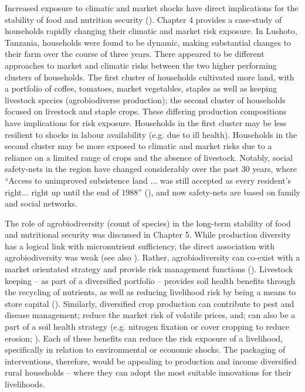 Increased exposure to climatic and market shocks have direct implications for the stability of food and nutrition security (\citealp{Ruel2018, Tomich2018, Jaenicke2013, Hussein1998}). Chapter 4 provides a case-study of households rapidly changing their climatic and market risk exposure. In Lushoto, Tanzania, households were found to be dynamic, making substantial changes to their farm over the course of three years. There appeared to be different approaches to market and climatic risks between the two higher performing clusters of households. The first cluster of households cultivated more land, with a portfolio of coffee, tomatoes, market vegetables, staples as well as keeping livestock species (agrobiodiverse production); the second cluster of households focused on livestock and staple crops. These differing production compositions have implications for risk exposure. Households in the first cluster may be less resilient to shocks in labour availability (e.g. due to ill health). Households in the second cluster may be more exposed to climatic and market risks due to a reliance on a limited range of crops and the absence of livestock. Notably, social safety-nets in the region have changed considerably over the past 30 years, where ``Access to unimproved subsistence land ... was still accepted as every resident's right... right up until the end of 1988'' (\citealp[p.~183]{Feierman1990}), and now safety-nets are based on family and social networks.

The role of agrobiodiversity (count of species) in the long-term stability of food and nutritional security was discussed in Chapter 5. While production diversity has a logical link with micronutrient sufficiency, the direct association with agrobiodiversity was weak (see also \citealp{Berti2015}). Rather, agrobiodiversity can co-exist with a market orientated strategy and provide risk management functions (\citealp{Waha2018a, Jaenicke2013, Tscharntke2012}). Livestock keeping -- as part of a diversified portfolio -- provides soil health benefits through the recycling of nutrients, as well as reducing livelihood risk by being a means to store capital (\citealp{Moll2005, Slingerland2000}). Similarly, diversified crop production can contribute to pest and disease management; reduce the market risk of volatile prices, and; can also be a part of a soil health strategy (e.g. nitrogen fixation or cover cropping to reduce erosion; \citealp{Lin2011}). Each of these benefits can reduce the risk exposure of a livelihood, specifically in relation to environmental or economic shocks. The packaging of interventions, therefore, would be appealing to production and income diversified rural households -- where they can adopt the most suitable innovations for their livelihoods.

